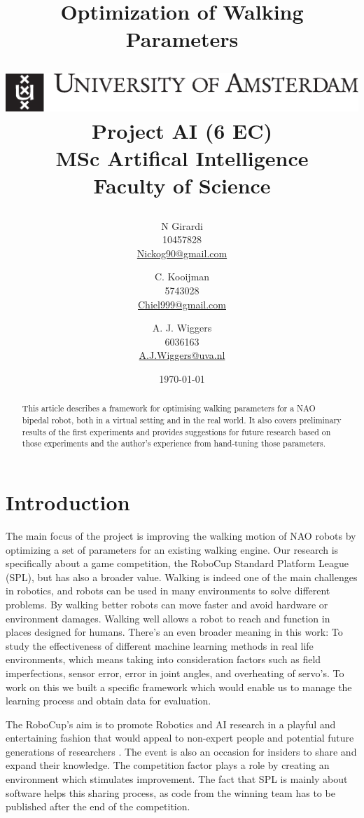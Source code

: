 \documentclass[a4paper, twocolumn]{article}
\title{Optimization of Walking Parameters\\
\vspace{.5em}
\begin{center}
	\includegraphics[scale=.8]{images/uva}\\ \normalsize
	Project AI (6 EC)\vspace{1em}\\MSc Artifical Intelligence\\Faculty of Science\\ \vspace{.2em}
\end{center}
}
\author{
N Girardi\\10457828\\\url{Nickog90@gmail.com} \and
C. Kooijman\\5743028\\\url{Chiel999@gmail.com} \and
A. J. Wiggers\\6036163\\\url{A.J.Wiggers@uva.nl}
}
\date{\today}
\begin{document}
\maketitle


\begin{abstract}
	This article describes a framework for optimising walking parameters for a
	NAO bipedal robot, both in a virtual setting and in the real world. It also
	covers preliminary results of the first experiments and provides
	suggestions for future research based on those experiments and the author's
	experience from hand-tuning those parameters.
\end{abstract}

\section{Introduction}
The main focus of the project is improving the walking motion of NAO robots by
optimizing a set of parameters for an existing walking engine. Our research is
specifically about a game competition, the RoboCup Standard Platform League
(SPL), but has also a broader value. Walking is indeed one of the main
challenges in robotics, and robots can be used in many environments to solve
different problems. By walking better robots can move faster and avoid hardware
or environment damages. Walking well allows a robot to reach and function in
places designed for humans. There's an even broader meaning in this work:
To study the effectiveness of different machine learning methods in real
life environments, which means taking into consideration factors such as field
imperfections, sensor error, error in joint angles, and overheating of servo's. To work on this
we built a specific framework which would enable us to manage the learning
process and obtain data for evaluation. 

The RoboCup's aim is to promote Robotics and AI research in a playful and
entertaining fashion that would appeal to non-expert people and potential
future generations of researchers \citep{kitano1997robocup}. The event is also
an occasion for insiders to share and expand their knowledge. The competition
factor plays a role by creating an environment which stimulates improvement.
The fact that SPL is mainly about software helps this sharing process, as code
from the winning team has to be published after the end of the competition. 
\end{document}
